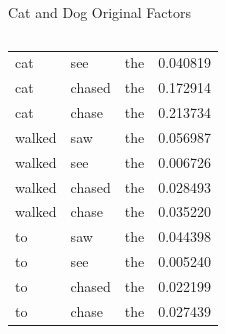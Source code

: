 \documentclass[handout]{beamer}
\begin{document}
\begin{frame}{Cat and Dog Original Factors}
\begin{columns}[T]
\begin{table}
\begin{tabular}{lll|r}
        cat & see & the & 0.040819\\
        cat & chased & the & 0.172914\\
        cat & chase & the & 0.213734\\
        walked & saw & the & 0.056987\\
        walked & see & the & 0.006726\\
        walked & chased & the & 0.028493\\
        walked & chase & the & 0.035220\\
        to & saw & the & 0.044398\\
        to & see & the & 0.005240\\
        to & chased & the & 0.022199\\
        to & chase & the & 0.027439\\
        \hline
      \end{tabular}
    \end{table}
\end{columns}
\end{frame}
\end{document}
